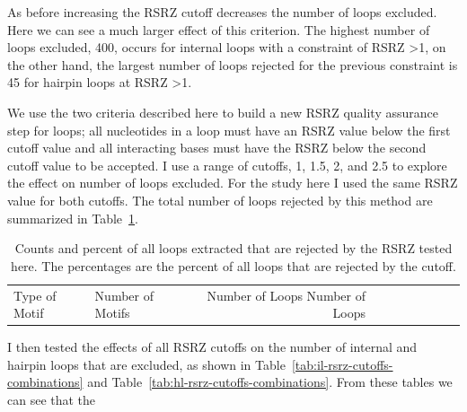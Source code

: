 As before increasing the RSRZ cutoff decreases the number of loops excluded.
Here we can see a much larger effect of this criterion. The highest number of
loops excluded, 400, occurs for internal loops with a constraint of RSRZ \textgreater 1, on
the other hand, the largest number of loops rejected for the previous constraint
is 45 for hairpin loops at RSRZ \textgreater 1.

We use the two criteria described here to build a new RSRZ quality assurance
step for loops; all nucleotides in a loop must have an RSRZ value below the
first cutoff value and all interacting bases must have the RSRZ below the second
cutoff value to be accepted. I use a range of cutoffs, 1, 1.5, 2, and 2.5 to
explore the effect on number of loops excluded. For the study here I used the
same RSRZ value for both cutoffs. The total number of loops rejected by this
method are summarized in Table~\ref{tab:rsrz-reject-summary}.

\begin{table}
  \begin{tabular}{llrrrrrrrr}
    Type of Motif &
      Number of Motifs &
      Number of Loops
      Number of Loops
  \end{tabular}
  \caption{Counts and percent of all loops extracted that are rejected by the
    RSRZ tested here. The percentages are the percent of all loops that are
  rejected by the cutoff.}
  \label{tab:rsrz-reject-summary}
\end{table}

I then tested the effects of all RSRZ cutoffs on the number of internal and
hairpin loops that are excluded, as shown in
Table~\ref{tab:il-rsrz-cutoffs-combinations} and
Table~\ref{tab:hl-rsrz-cutoffs-combinations}. From these tables we can see that
the

